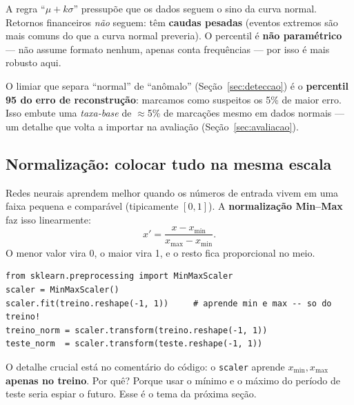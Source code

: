 \begin{intuicao}
A regra ``$\mu + k\sigma$'' pressupõe que os dados seguem o sino da curva
normal. Retornos financeiros \emph{não} seguem: têm \textbf{caudas pesadas}
(eventos extremos são mais comuns do que a curva normal preveria). O percentil
é \textbf{não paramétrico} --- não assume formato nenhum, apenas conta
frequências --- por isso é mais robusto aqui.
\end{intuicao}

\begin{naprat}
O limiar que separa ``normal'' de ``anômalo'' (Seção~\ref{sec:deteccao}) é o
\textbf{percentil 95 do erro de reconstrução}: marcamos como suspeitos os 5\%
de maior erro. Isso embute uma \emph{taxa-base} de $\approx$5\% de marcações
mesmo em dados normais --- um detalhe que volta a importar na avaliação
(Seção~\ref{sec:avaliacao}).
\end{naprat}

\subsection{Normalização: colocar tudo na mesma escala}
Redes neurais aprendem melhor quando os números de entrada vivem em uma faixa
pequena e comparável (tipicamente $[0,1]$). A \textbf{normalização Min--Max}
faz isso linearmente:
\[
x' = \frac{x - x_{\min}}{x_{\max} - x_{\min}} .
\]
O menor valor vira 0, o maior vira 1, e o resto fica proporcional no meio.

\begin{lstlisting}[caption={Min--Max com scikit-learn.}]
from sklearn.preprocessing import MinMaxScaler
scaler = MinMaxScaler()
scaler.fit(treino.reshape(-1, 1))     # aprende min e max -- so do treino!
treino_norm = scaler.transform(treino.reshape(-1, 1))
teste_norm  = scaler.transform(teste.reshape(-1, 1))
\end{lstlisting}

\begin{intuicao}
O detalhe crucial está no comentário do código: o \texttt{scaler} aprende
$x_{\min}, x_{\max}$ \textbf{apenas no treino}. Por quê? Porque usar o mínimo e
o máximo do período de teste seria espiar o futuro. Esse é o tema da próxima
seção.
\end{intuicao}
